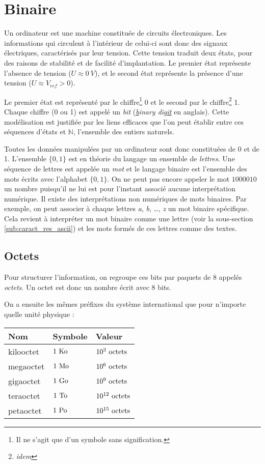 \documentclass[../../main.tex]{subfiles}
\begin{document}
\section{Binaire}
Un ordinateur est une machine constituée de circuits électroniques. Les informations qui circulent à l'intérieur de celui-ci sont donc des signaux électriques, caractérisés par leur tension. Cette tension traduit deux états, pour des raisons de stabilité et de facilité d'implantation. Le premier état représente l'absence de tension ($U \approx 0\ V$), et le second état représente la présence d'une tension ($U \approx V_{ref} > 0$).

Le premier état est représenté par le chiffre\footnote{Il ne s'agit que d'un symbole sans signification.} 0 et le second par le chiffre\footnote{\textit{idem}} 1. Chaque chiffre (0 ou 1) est appelé un \textit{bit} (\textit{\underline{b}inary dig\underline{it}} en anglais). Cette modélisation est justifiée par les liens efficaces que l'on peut établir entre ces séquences d'états et $\mathbb{N}$, l'ensemble des entiers naturels.

Toutes les données manipulées par un ordinateur sont donc constituées de 0 et de 1. L'ensemble $\{0, 1\}$ est en théorie du langage un ensemble de \textit{lettres}. Une séquence de lettres est appelée un \textit{mot} et le langage binaire est l'ensemble des mots écrits avec l'alphabet $\{0, 1\}$. On ne peut pas encore appeler le mot $1000010$ un nombre puisqu'il ne lui est pour l'instant associé aucune interprétation numérique. Il existe des interprétations non numériques de mots binaires. Par exemple, on peut associer à chaque lettres \textit{a}, \textit{b}, \dots, \textit{z} un mot binaire spécifique. Cela revient à interpréter un mot binaire comme une lettre (voir la sous-section \ref{sub:caract_res_ascii}) et les mots formés de ces lettres comme des textes. 
\subsection{Octets}
\label{ssub:octets}
Pour structurer l'information, on regroupe ces bits par paquets de 8 appelés \textit{octets}. Un octet est donc un nombre écrit avec 8 bits.

On a ensuite les mêmes préfixes du système international que pour n'importe quelle unité physique :

\begin{center}
  \begin{tabular}{|l|l|l|}
  \hline 
  \textbf{Nom} & \textbf{Symbole} & \textbf{Valeur} \\
  \hline
  kilooctet & $1\ \rm{Ko}$ & $10^3\ \rm{octets}$ \\
  megaoctet & $1\ \rm{Mo}$ & $10^6\ \rm{octets}$ \\
  gigaoctet & $1\ \rm{Go}$ & $10^9\ \rm{octets}$ \\
  teraoctet & $1\ \rm{To}$ & $10^{12}\ \rm{octets}$ \\
  petaoctet & $1\ \rm{Po}$ & $10^{15}\ \rm{octets}$ \\
  \hline
  \end{tabular}
\end{center}
\end{document}
